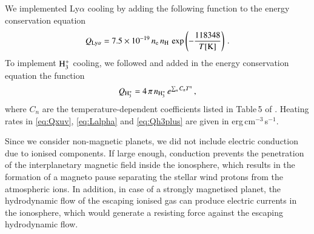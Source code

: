 \documentclass{aa}
\def\hhh{{\rm H_3^+}}
\def\qhhh{Q_{\rm H_3^+}}
\def\nhhh{n_{\rm H_3^+}}
\begin{document}
We implemented Ly$\alpha$ cooling by adding the following function to the energy conservation equation \citep{watson1981}
%
\begin{equation}\label{eq:Lalpha}
Q_{\rm Ly\alpha} = 7.5 \times 10^{-19}\,n_{\rm e}\,n_{\rm
H}\,\exp\left(-\frac{118348}{T[{\rm K}]}\right)\,.
\end{equation}
%
To implement $\hhh$ cooling, we followed \citet{miller2013} and added in the energy conservation equation the function
%
\begin{equation}\label{eq:Qh3plus}
\qhhh = 4\,\pi\,\nhhh\,e^{\sum_{n} C_{n}T^n}\,,
\end{equation}
%
where $C_n$ are the temperature-dependent coefficients listed in
Table\,5 of \citet{miller2013}. {Heating rates in \ref{eq:Qxuv},
\ref{eq:Lalpha} and \ref{eq:Qh3plus} are given in
erg\,cm$^{-3}$\,s$^{-1}$.}

{Since we consider non-magnetic planets, we did not include
electric conduction due to ionised components. If large enough,
conduction prevents the penetration of the interplanetary magnetic
field inside the ionosphere, which results in the formation of a
magneto pause separating the stellar wind protons from the
atmospheric ions. In addition, in case of a strongly magnetised
planet, the hydrodynamic flow of the escaping ionised gas can
produce electric currents in the ionosphere, which would generate
a resisting force against the escaping hydrodynamic flow.}
\end{document}

